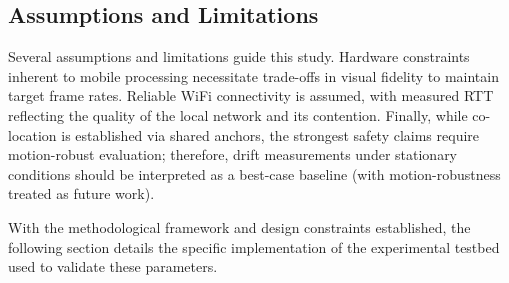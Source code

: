 \subsection{Assumptions and Limitations}
Several assumptions and limitations guide this study. Hardware constraints inherent to mobile processing necessitate trade-offs in visual fidelity to maintain target frame rates. Reliable WiFi connectivity is assumed, with measured RTT reflecting the quality of the local network and its contention. Finally, while co-location is established via shared anchors, the strongest safety claims require motion-robust evaluation; therefore, drift measurements under stationary conditions should be interpreted as a best-case baseline (with motion-robustness treated as future work).

With the methodological framework and design constraints established, the following section details the specific implementation of the experimental testbed used to validate these parameters.
